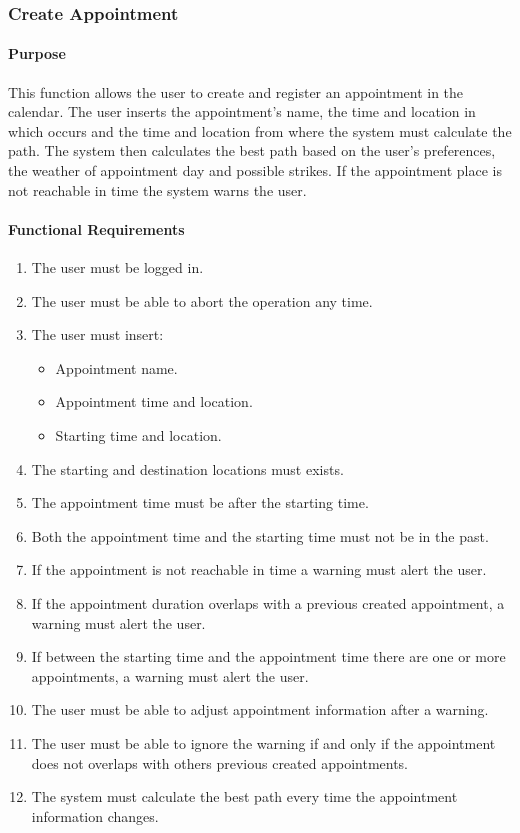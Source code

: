 \clearpage
\subsubsection{Create Appointment}
\paragraph*{Purpose\\}
This function allows the user to create and register an appointment in the calendar. The user inserts the appointment’s name, the time and location in which occurs and the time and location from where the system must calculate the path. The system then calculates the best path based on the user’s preferences, the weather of appointment day and possible strikes. If the appointment place is not reachable in time the system warns the user.

\paragraph*{Functional Requirements}
\begin{enumerate}[label=R.\arabic*:, resume]
	\item The user must be logged in.
	\item The user must be able to abort the operation any time.
	\item {\label{req:appointmentinformation}}The user must insert:
	\begin{itemize}
		\item Appointment name.
		\item Appointment time and location.
		\item Starting time and location.		
	\end{itemize}
	\item The starting and destination locations must exists.
	\item The appointment time must be after the starting time.
	\item Both the appointment time and the starting time must not be in the past.
	\item If the appointment is not reachable in time a warning must alert the user.
	\item If the appointment duration overlaps with a previous created appointment, a warning must alert the user.
	\item If between the starting time and the appointment time there are one or more appointments, a warning must alert the user.
	\item The user must be able to adjust appointment information after a warning.
	\item The user must be able to ignore the warning if and only if the appointment does not overlaps with others previous created appointments.
	\item The system must calculate the best path every time the appointment information changes.
\end{enumerate}

